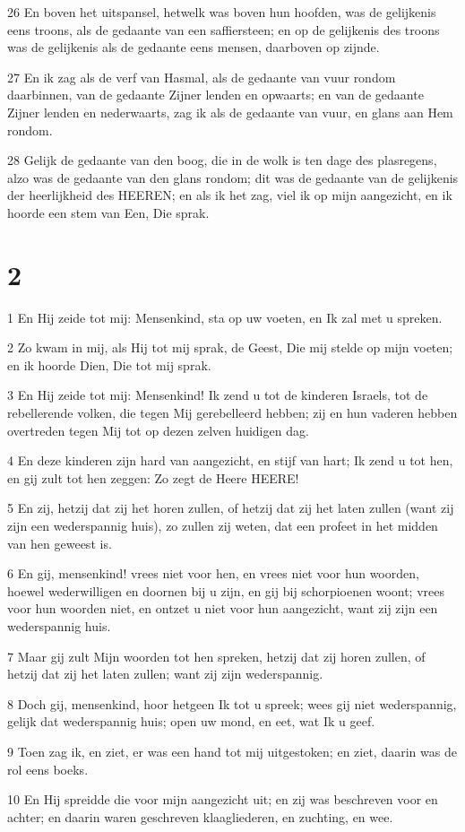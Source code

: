 \par 26 En boven het uitspansel, hetwelk was boven hun hoofden, was de gelijkenis eens troons, als de gedaante van een saffiersteen; en op de gelijkenis des troons was de gelijkenis als de gedaante eens mensen, daarboven op zijnde.
\par 27 En ik zag als de verf van Hasmal, als de gedaante van vuur rondom daarbinnen, van de gedaante Zijner lenden en opwaarts; en van de gedaante Zijner lenden en nederwaarts, zag ik als de gedaante van vuur, en glans aan Hem rondom.
\par 28 Gelijk de gedaante van den boog, die in de wolk is ten dage des plasregens, alzo was de gedaante van den glans rondom; dit was de gedaante van de gelijkenis der heerlijkheid des HEEREN; en als ik het zag, viel ik op mijn aangezicht, en ik hoorde een stem van Een, Die sprak.

\chapter{2}

\par 1 En Hij zeide tot mij: Mensenkind, sta op uw voeten, en Ik zal met u spreken.
\par 2 Zo kwam in mij, als Hij tot mij sprak, de Geest, Die mij stelde op mijn voeten; en ik hoorde Dien, Die tot mij sprak.
\par 3 En Hij zeide tot mij: Mensenkind! Ik zend u tot de kinderen Israels, tot de rebellerende volken, die tegen Mij gerebelleerd hebben; zij en hun vaderen hebben overtreden tegen Mij tot op dezen zelven huidigen dag.
\par 4 En deze kinderen zijn hard van aangezicht, en stijf van hart; Ik zend u tot hen, en gij zult tot hen zeggen: Zo zegt de Heere HEERE!
\par 5 En zij, hetzij dat zij het horen zullen, of hetzij dat zij het laten zullen (want zij zijn een wederspannig huis), zo zullen zij weten, dat een profeet in het midden van hen geweest is.
\par 6 En gij, mensenkind! vrees niet voor hen, en vrees niet voor hun woorden, hoewel wederwilligen en doornen bij u zijn, en gij bij schorpioenen woont; vrees voor hun woorden niet, en ontzet u niet voor hun aangezicht, want zij zijn een wederspannig huis.
\par 7 Maar gij zult Mijn woorden tot hen spreken, hetzij dat zij horen zullen, of hetzij dat zij het laten zullen; want zij zijn wederspannig.
\par 8 Doch gij, mensenkind, hoor hetgeen Ik tot u spreek; wees gij niet wederspannig, gelijk dat wederspannig huis; open uw mond, en eet, wat Ik u geef.
\par 9 Toen zag ik, en ziet, er was een hand tot mij uitgestoken; en ziet, daarin was de rol eens boeks.
\par 10 En Hij spreidde die voor mijn aangezicht uit; en zij was beschreven voor en achter; en daarin waren geschreven klaagliederen, en zuchting, en wee.

